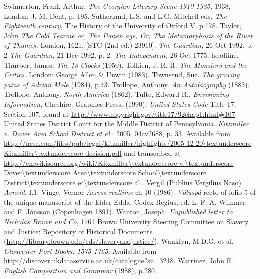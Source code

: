 \begin{bibitemlist}{1}
 Swinnerton, Frank Arthur. \textit{The Georgian Literary Scene 1910-1935}, 1938, London: J. M. Dent, p. 195.
 Sutherland, L.S. and L.G. Mitchell eds. \textit{The Eighteenth century}, The History of the University of Oxford V, p.178.
 Taylor, John \textit{The Cold Tearme or, The Frozen age, Or, The Metamorphosis of the Riuer of Thames.} London, 1621. [STC (2nd ed.) 23910].
 \textit{The Guardian,} 26 Oct 1992, p. 2
 \textit{The Guardian,} 21 Dec 1992, p. 2.
 \textit{The Independent,} 26 Oct 1775, headline.
 Thurber, James. \textit{The 13 Clocks} (1950).
 Tolkien, J. R. R. \textit{The Monsters and the Critics}. London: George Allen \& Unwin (1983).
 Townsend, Sue. \textit{The growing pains of Adrian Mole} (1984), p.43.
 Trollope, Anthony. \textit{An Autobiography} (1883).
 Trollope, Anthony. \textit{North America} (1862).
 Tufte, Edward R., \textit{Envisioning Information}, Cheshire: Graphics Press. (1990).
 \textit{United States Code} Title 17, Section 107, found at \url{http://www.copyright.gov/title17/92chap1.html\#107}.
 United States District Court for the Middle District of Pennsylvania. \textit{Kitzmiller v. Dover Area School District et al.}: 2005.  04cv2688, p. 33. Available from \url{http://ncse.com/files/pub/legal/kitzmiller/highlights/2005-12-20\textunderscore Kitzmiller\textunderscore decision.pdf} and transcribed at \url{http://en.wikisource.org/wiki/Kitzmiller\textunderscore v.\textunderscore Dover\textunderscore Area\textunderscore School\textunderscore District\textunderscore et\textunderscore al.}.
 Vergil (Publius Vergilius Naso). \textit{Aeneid}, I.1.
 Vinge, Vernor \textit{Across realtime} ch 10 (1986).
 \textit{Vóluspá} recto of folio 5 of the unique manuscript of the Elder Edda. Codex Regius, ed. L. F. A. Wimmer and F. Jónsson (Copenhagen 1891).
  Wanton, Joseph. \textit{Unpublished letter to Nicholas Brown and Co}, 1761 Brown University Steering Committee on Slavery and Justice: Repository of Historical Documents.  (\url{http://library.brown.edu/cds/slaveryandjustice/}).
 Wanklyn, M.D.G.  et al. \textit{Gloucester Port Books, 1575-1765}. Available from \url{http://discover.ukdataservice.ac.uk/catalogue?sn=3218}.
 Warriner, John E.  \textit{English Composition and Grammar} (1988), p.280.

\end{bibitemlist}

